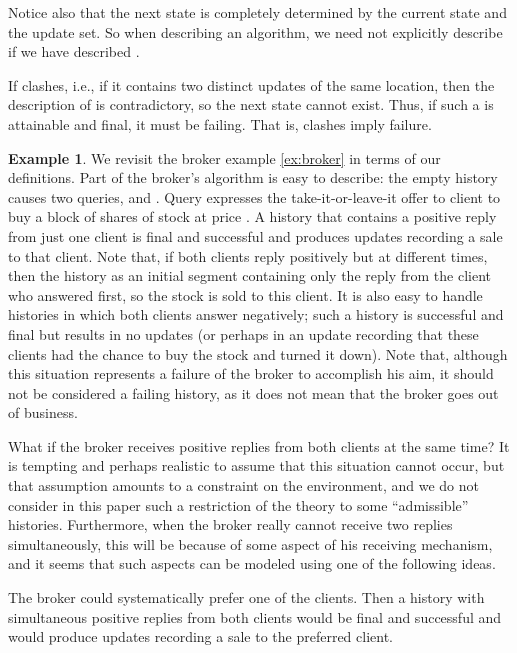 \documentclass{LMCS}
\theoremstyle{definition}
\newtheorem{ex}[thm]{Example}
\begin{document}
Notice also that the next state is completely determined by the
current state and the update set.  So when describing an algorithm, we
need not explicitly describe  if we have described .

If  clashes, i.e., if it contains two distinct updates of
the same location, then the description of  is
contradictory, so the next state cannot exist.  Thus, if such a 
is attainable and final, it must be failing.  That is, clashes imply
failure.

\begin{ex}\label{ex;broker:re} We revisit the broker example
  \ref{ex:broker} in terms of our definitions.  Part of the broker's
  algorithm is easy to describe: the empty history causes two queries,
   and .  Query  expresses the
  take-it-or-leave-it offer to client  to buy a block
  of  shares of stock  at price .  A history that contains a
  positive reply from just one client is final and successful and produces
  updates recording a sale to that client.  Note that, if both clients
  reply positively but at different times, then the history as an
  initial segment containing only the reply from the client who
  answered first, so the stock is sold to this client.  It is also
  easy to handle histories in which both clients answer negatively;
  such a history is successful and final but results in no updates (or
  perhaps in an update recording that these clients had the chance to
  buy the stock and turned it down).  Note that, although this
  situation represents a failure of the broker to accomplish his aim,
  it should not be considered a failing history, as it does not mean
  that the broker goes out of business.  

  What if the broker receives positive replies from both clients at
  the same time?  It is tempting and perhaps realistic to assume that
  this situation cannot occur, but that assumption amounts to a
  constraint on the environment, and we do not consider in this paper
  such a restriction of the theory to some ``admissible'' histories.
  Furthermore, when the broker really cannot receive two replies
  simultaneously, this will be because of some aspect of his receiving
  mechanism, and it seems that such aspects can be modeled using one of
  the following ideas.

  The broker could systematically prefer one of the clients.  Then a
  history with simultaneous positive replies from both clients would
  be final and successful and would produce updates recording a sale
  to the preferred client.


\end{ex}
\end{document}
